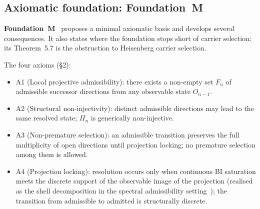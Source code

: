 \documentclass[11pt,a4paper]{article}
\theoremstyle{definition}
\begin{document}
    \subsection{Axiomatic foundation: Foundation~M}
      \label{sec:foundation}

      \textbf{Foundation~M}~\cite{Beau2026m} proposes a minimal axiomatic basis and develops
      several consequences.  It also states where the foundation stops short of carrier selection:
      its Theorem~5.7 is the obstruction to Heisenberg carrier selection.

      The four axioms (§2):
      \begin{itemize}
        \item A1 (Local projective admissibility): there exists a non-empty set $F_n$ of admissible
        successor directions from any observable state $O_{n-1}$.
        \item A2 (Structural non-injectivity): distinct admissible directions may lead to the same
        resolved state; $\Pi_n$ is generically non-injective.
        \item A3 (Non-premature selection): an admissible transition preserves the full multiplicity
        of open directions until projection locking; no premature selection among them is allowed.
        \item A4 (Projection locking): resolution occurs only when continuous BI saturation meets
        the discrete support of the observable image of the projection (realised as the shell
        decomposition in the spectral admissibility setting~\cite{Beau2026a26}); the transition from
        admissible to admitted is structurally discrete.
      \end{itemize}
\end{document}
